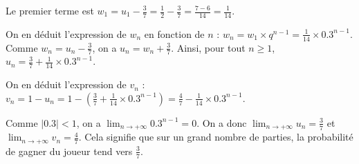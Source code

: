 {\begin{enumerate}
{			Le premier terme est $w_1 = u_1 - \frac{3}{7} = \frac{1}{2} - \frac{3}{7} = \frac{7 - 6}{14} = \frac{1}{14}$.
			
			On en déduit l'expression de $w_n$ en fonction de $n$ : $w_n = w_1 \times q^{n-1} = \frac{1}{14} \times 0.3^{n-1}$.
			Comme $w_n = u_n - \frac{3}{7}$, on a $u_n = w_n + \frac{3}{7}$.
			Ainsi, pour tout $n \geqslant 1$, $u_n = \frac{3}{7} + \frac{1}{14} \times 0.3^{n-1}$.
			
			On en déduit l'expression de $v_n$ :
			$v_n = 1 - u_n = 1 - \left(\frac{3}{7} + \frac{1}{14} \times 0.3^{n-1}\right) = \frac{4}{7} - \frac{1}{14} \times 0.3^{n-1}$.
			
			Comme $|0.3| < 1$, on a $\lim_{n \to +\infty} 0.3^{n-1} = 0$.
			On a donc $\lim_{n \to +\infty} u_n = \frac{3}{7}$ et $\lim_{n \to +\infty} v_n = \frac{4}{7}$. Cela signifie que sur un grand nombre de parties, la probabilité de gagner du joueur tend vers $\frac{3}{7}$. 
		}
	\end{enumerate}
}
